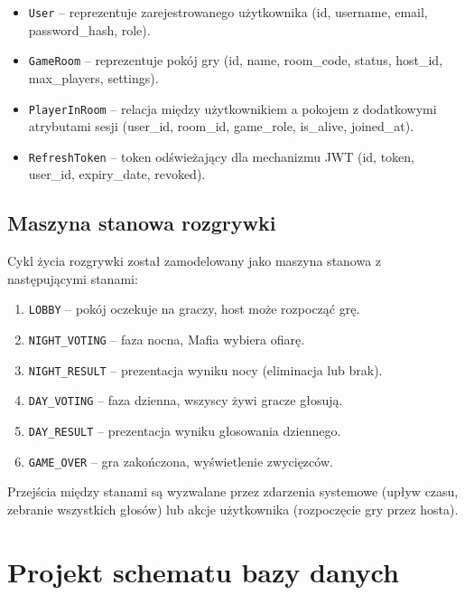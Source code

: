 ﻿\documentclass[a4paper,twoside,11pt]{mwrep}
\theoremstyle{plain} \newtheorem{thm}{Twierdzenie}
\theoremstyle{plain} \newtheorem{lem}{Lemat}
\theoremstyle{definition} \newtheorem{defn}{Definicja}
\theoremstyle{remark} \newtheorem*{rem}{Wniosek}
\begin{document}
\begin{itemize}
    \item \texttt{User} -- reprezentuje zarejestrowanego użytkownika (id, username, email, password\_hash, role).
    
    \item \texttt{GameRoom} -- reprezentuje pokój gry (id, name, room\_code, status, host\_id, max\_players, settings).
    
    \item \texttt{PlayerInRoom} -- relacja między użytkownikiem a pokojem z dodatkowymi atrybutami sesji (user\_id, room\_id, game\_role, is\_alive, joined\_at).
    
    \item \texttt{RefreshToken} -- token odświeżający dla mechanizmu JWT (id, token, user\_id, expiry\_date, revoked).
\end{itemize}

\subsection{Maszyna stanowa rozgrywki}

Cykl życia rozgrywki został zamodelowany jako maszyna stanowa z następującymi stanami:

\begin{enumerate}
    \item \texttt{LOBBY} -- pokój oczekuje na graczy, host może rozpocząć grę.
    \item \texttt{NIGHT\_VOTING} -- faza nocna, Mafia wybiera ofiarę.
    \item \texttt{NIGHT\_RESULT} -- prezentacja wyniku nocy (eliminacja lub brak).
    \item \texttt{DAY\_VOTING} -- faza dzienna, wszyscy żywi gracze głosują.
    \item \texttt{DAY\_RESULT} -- prezentacja wyniku głosowania dziennego.
    \item \texttt{GAME\_OVER} -- gra zakończona, wyświetlenie zwycięzców.
\end{enumerate}

Przejścia między stanami są wyzwalane przez zdarzenia systemowe (upływ czasu, zebranie wszystkich głosów) lub akcje użytkownika (rozpoczęcie gry przez hosta).

\section{Projekt schematu bazy danych}
\end{document}
